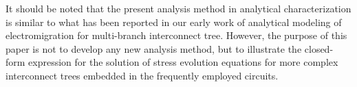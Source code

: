 It should be noted that the present analysis method in analytical characterization is similar to what has been reported in our early work of analytical modeling of electromigration for multi-branch interconnect tree. However, the purpose of this paper is not to develop any new analysis method, but to illustrate the closed-form expression for the solution of stress evolution equations for more complex interconnect trees embedded in the frequently employed circuits.







